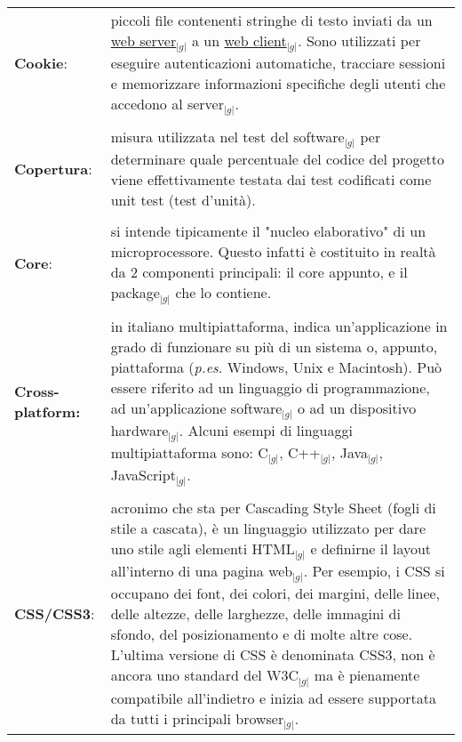 \begin{longtable}{p{} p{}}
	    \\
	    \textbf{Cookie}:			&	piccoli file contenenti stringhe di testo inviati da un \underline{web server}$_{|g|}$ a un \underline{web client}$_{|g|}$. Sono utilizzati per eseguire autenticazioni automatiche, tracciare sessioni e memorizzare informazioni 
							specifiche degli utenti che accedono al server$_{|g|}$.\\
	    \\
	    \textbf{Copertura}:			&	misura utilizzata nel test del software$_{|g|}$ per determinare quale percentuale del codice del progetto viene effettivamente testata dai test codificati come unit test (test d'unità).\\
	    \\
	    \textbf{Core}:			&	si intende tipicamente il "nucleo elaborativo" di un microprocessore. Questo infatti è costituito in realtà da 2 componenti principali: il core appunto, e il package$_{|g|}$ che lo contiene.\\
	    \\
	    \textbf{Cross-platform:}		&	in italiano multipiattaforma, indica un’applicazione in grado di funzionare su più di un sistema o, appunto, piattaforma (\textit{p.es.} Windows, Unix e Macintosh). Può essere riferito ad un linguaggio di programmazione, 
							ad un'applicazione software$_{|g|}$ o ad un dispositivo hardware$_{|g|}$. Alcuni esempi di linguaggi multipiattaforma sono: C$_{|g|}$, C++$_{|g|}$, Java$_{|g|}$, JavaScript$_{|g|}$.\\
	    \\
	    \textbf{CSS/CSS3}:			&	acronimo che sta per Cascading Style Sheet (fogli di stile a cascata), è un linguaggio utilizzato per dare uno stile agli elementi HTML$_{|g|}$ e definirne il layout all’interno 
							di una pagina web$_{|g|}$. Per esempio, i CSS si occupano dei font, dei colori, dei margini, delle linee, delle altezze, delle larghezze, delle immagini di sfondo, del posizionamento 
							e di molte altre cose.\newline
							L’ultima versione di CSS è denominata CSS3, non è ancora uno standard del W3C$_{|g|}$ ma è pienamente compatibile all’indietro e inizia ad essere supportata da tutti i principali browser$_{|g|}$.\\
	\end{longtable}
\newpage


